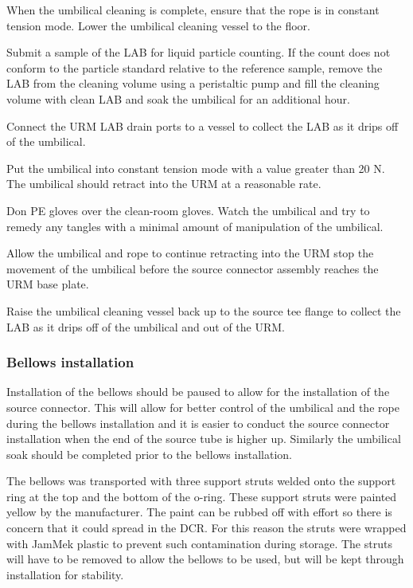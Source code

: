 \documentclass[11pt]{article}
\begin{document}
\begin{answerlist}
\item When the umbilical cleaning is complete, ensure that the rope is in constant tension mode. Lower the umbilical cleaning vessel to the floor.
\item Submit a sample of the LAB for liquid particle counting. If the count does not conform to the particle standard relative to the reference sample, remove the LAB from the cleaning volume using a peristaltic pump and fill the cleaning volume with clean LAB and soak the umbilical for an additional hour. 
\item Connect the URM LAB drain ports to a vessel to collect the LAB as it drips off of the umbilical.
\item Put the umbilical into constant tension mode with a value greater than 20 N. The umbilical should retract into the URM at a reasonable rate.
\item Don PE gloves over the clean-room gloves. Watch the umbilical and try to remedy any tangles with a minimal amount of manipulation of the umbilical.
\item Allow the umbilical and rope to continue retracting into the URM stop the movement of the umbilical before the source connector assembly reaches the URM base plate.
\item Raise the umbilical cleaning vessel back up to the source tee flange to collect the LAB as it drips off of the umbilical and out of the URM.
\end{answerlist}
  

\subsubsection{Bellows installation}\label{sss:BellowsInstall}
Installation of the bellows should be paused to allow for the
installation of the source connector. This will allow for better
control of the umbilical and the rope during the bellows installation
and it is easier to conduct the source connector installation when the
end of the source tube is higher up. Similarly the umbilical soak
should be completed prior to the bellows installation.

The bellows was transported with three support struts welded onto the
support ring at the top and the bottom of the o-ring. These support
struts were painted yellow by the manufacturer. The paint can be
rubbed off with effort so there is concern that it could spread in the
DCR. For this reason the struts were wrapped with JamMek plastic to prevent
such contamination during storage. The struts will have to be removed
to allow the bellows to be used, but will be kept through installation
for stability.
\end{document}
